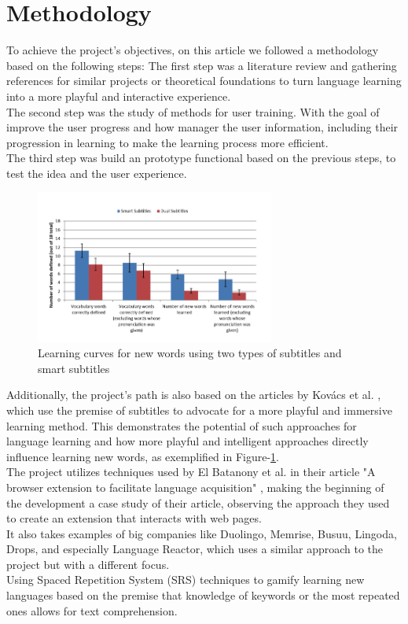 \documentclass[12pt]{article}
\begin{document}
\section{Methodology}
To achieve the project's objectives, on this article we followed a methodology based on the following steps:
The first step was a literature review and gathering references for similar projects or theoretical foundations to turn language learning into a more playful and interactive experience. \\
The second step was the study of methods for user training. With the goal of improve the user progress and how manager the user information, including their progression in learning to make the learning process more efficient. \\
The third step was build an prototype functional based on the previous steps, to test the idea and the user experience. 
\begin{figure}[!h]
\centering
\caption{Learning curves for new words using two types of subtitles and smart subtitles}
\label{fig:my_label}
\includegraphics[width=0.7\textwidth]{assets/3.png}
\end{figure} 
Additionally, the project's path is also based on the articles by Kovács et al. \cite{Kovacs14}, which use the premise of subtitles to advocate for a more playful and immersive learning method. This demonstrates the potential of such approaches for language learning and how more playful and intelligent approaches directly influence learning new words, as exemplified in Figure-\ref{fig:my_label}. \\
The project utilizes techniques used by El Batanony et al. in their article "A browser extension to facilitate language acquisition" \cite{ElBatanony21}, making the beginning of the development a case study of their article, observing the approach they used to create an extension that interacts with web pages.  \\
It also takes examples of big companies like Duolingo, Memrise, Busuu, Lingoda, Drops, and especially Language Reactor, which uses a similar approach to the project but with a different focus.  \\
Using Spaced Repetition System (SRS) techniques to gamify learning new languages based on the premise that knowledge of keywords or the most repeated ones allows for text comprehension. \\
\end{document}
